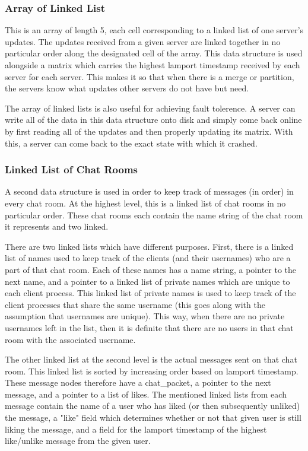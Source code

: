\documentclass[12pt,journal,compsoc]{IEEEtran}
\begin{document}
\subsubsection{Array of Linked List}
This is an array of length 5, each cell corresponding to a linked list of one server's updates. The updates received from a given server are linked together in no particular order along the designated cell of the array. This data structure is used alongside a matrix which carries the highest lamport timestamp received by each server for each server. This makes it so that when there is a merge or partition, the servers know what updates other servers do not have but need.

The array of linked lists is also useful for achieving fault tolerence. A server can write all of the data in this data structure onto disk and simply come back online by first reading all of the updates and then properly updating its matrix. With this, a server can come back to the exact state with which it crashed.


\subsubsection{Linked List of Chat Rooms}
A second data structure is used in order to keep track of messages (in order) in every chat room. At the highest level, this is a linked list of chat rooms in no particular order. These chat rooms each contain the name string of the chat room it represents and two linked.

There are two linked lists which have different purposes. First, there is a linked list of names used to keep track of the clients (and their usernames) who are a part of that chat room. Each of these names has a name string, a pointer to the next name, and a pointer to a linked list of private names which are unique to each client process. This linked list of private names is used to keep track of the client processes that share the same username (this goes along with the assumption that usernames are unique). This way, when there are no private usernames left in the list, then it is definite that there are no users in that chat room with the associated username.

The other linked list at the second level is the actual messages sent on that chat room. This linked list is sorted by increasing order based on lamport timestamp. These message nodes therefore have a chat\_packet, a pointer to the next message, and a pointer to a list of likes. The mentioned linked lists from each message contain the name of a user who has liked (or then subsequently unliked) the message, a "like" field which determines whether or not that given user is still liking the message, and a field for the lamport timestamp of the highest like/unlike message from the given user.
\end{document}
